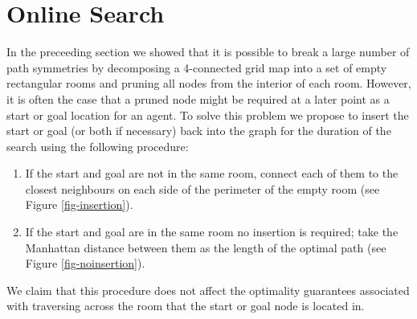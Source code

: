 \section{Online Search}
In the preceeding section we showed that it is possible to break a large 
number of path symmetries by decomposing a 4-connected grid map into 
a set of empty rectangular rooms and pruning all nodes from the interior of
each room.
However, it is often the case that a pruned node might be required at a later
point as a start or goal location for an agent.
To solve this problem we propose to insert the start or goal (or both if necessary)
back into the graph for the duration of the search using the following procedure:
\begin{enumerate}
\item{If the start and goal are not in the same room, connect each of them
to the closest neighbours on each side of the perimeter of the empty room (see Figure \ref{fig-insertion}).}
\item{If the start and goal are in the same room no insertion is required;
 take the Manhattan distance between them as the length of the optimal path (see Figure \ref{fig-noinsertion}).}
\end{enumerate}
We claim that this procedure does not affect the optimality guarantees associated with traversing
across the room that the start or goal node is located in. 

